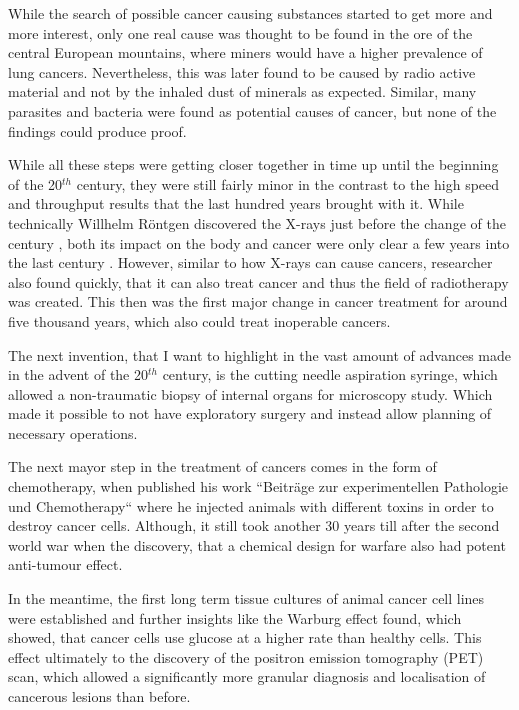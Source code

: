While the search of possible cancer causing substances started to get more and more interest, only one real cause was thought to be found in the ore of the central European mountains, where miners would have a higher prevalence of lung cancers. Nevertheless, this was later found to be caused by radio active material and not by the inhaled dust of minerals as expected. Similar, many parasites and bacteria were found as potential causes of cancer, but none of the findings could produce proof.

While all these steps were getting closer together in time up until the beginning of the 20$^{th}$ century, they were still fairly minor in the contrast to the high speed and throughput results that the last hundred years brought with it. While technically Willhelm R\"ontgen discovered the X-rays just before the change of the century \cite{Roentgen1898}, both its impact on the body and cancer were only clear a few years into the last century \cite{Frieben1902,Scholtz1902}. However, similar to how X-rays can cause cancers, researcher also found quickly, that it can also treat cancer and thus the field of radiotherapy was created. This then was the first major change in cancer treatment for around five thousand years, which also could treat inoperable cancers.

The next invention, that I want to highlight in the vast amount of advances made in the advent of the 20$^{th}$ century, is the cutting needle aspiration syringe, which allowed a non-traumatic biopsy of internal organs for microscopy study. Which made it possible to not have exploratory surgery and instead allow planning of necessary operations.

The next mayor step in the treatment of cancers comes in the form of chemotherapy, when \textcite{Ehrlich1909} published his work ``Beitr\"age zur experimentellen Pathologie und Chemotherapy`` where he injected animals with different toxins in order to destroy cancer cells. Although, it still took another 30 years till after the second world war when the discovery, that a chemical design for warfare also had potent anti-tumour effect.

In the meantime, the first long term tissue cultures of animal cancer cell lines were established and further insights like the Warburg effect \cite{Warburg1928} found, which showed, that cancer cells use glucose at a higher rate than healthy cells. This effect ultimately to the discovery of the positron emission tomography (PET) scan, which allowed a significantly more granular diagnosis and localisation of cancerous lesions than before.

